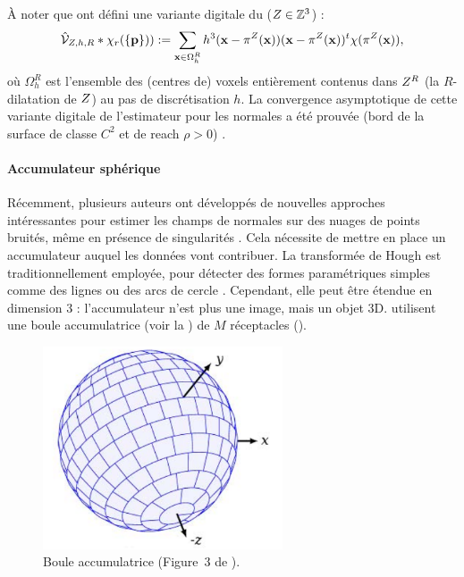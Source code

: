 À noter que  ont défini une variante digitale du
\VCM ($Z \in \mathbb{Z}^3$) :
%
\begin{equation}
  \hat{\mathcal{V}}_{Z,h,R} \ast \chi_r(\{\mathbf{p}\})) := \sum_{\mathbf{x} \in \Omega_h^R} h^3 (\mathbf{x} - \pi^{Z}(\mathbf{x})) (\mathbf{x} - \pi^{Z}(\mathbf{x}))^t \chi(\pi^{Z}(\mathbf{x})) ,
\end{equation}
%
où $\Omega_h^R$ est l'ensemble des (centres de) voxels entièrement contenus dans
$Z^R$ (la $R$-dilatation de $Z$) au pas de discrétisation $h$.
La convergence asymptotique de cette variante digitale de l'estimateur \VCM pour
les normales a été prouvée (bord de la surface de classe $C^2$ et de reach $\rho >
0$) \cite{Cuel2014DGCI}.
%
\paragraph{Accumulateur sphérique}
%
Récemment, plusieurs auteurs ont développés de nouvelles approches intéressantes
pour estimer les champs de normales sur des nuages de points bruités, même en
présence de singularités \cite{Li2010, Boulch2012, Zhang2013}. Cela nécessite de
mettre en place un accumulateur auquel les données vont contribuer. La
transformée de Hough \cite{Hough1962} est traditionnellement employée, pour
détecter des formes paramétriques simples comme des lignes ou des arcs de cercle
\cite{Duda1972}. Cependant, elle peut être étendue en dimension 3 :
l'accumulateur n'est plus une image, mais un objet 3D.
 utilisent une boule accumulatrice (voir la
) de $M$ réceptacles ().

\begin{figure}[ht]{
    \begin{center}
    \includegraphics[height=6cm]{images/Curvature/Hough_ball}
    \end{center}}
    \caption[Boule accumulatrice.]{Boule accumulatrice (Figure~3 de \cite{Borrmann2011}). \label{fig:hough-ball}}
\end{figure}

